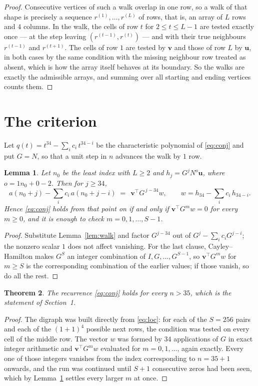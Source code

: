 \documentclass[11pt,a4paper]{article}
\theoremstyle{plain}
\newtheorem{theorem}{Theorem}
\newtheorem{lemma}[theorem]{Lemma}
\theoremstyle{definition}
\begin{document}
\begin{proof}
Consecutive vertices of such a walk overlap in one row, so a walk of that shape is
precisely a sequence $r^{(1)},\dots,r^{(L)}$ of rows, that is, an array of $L$ rows
and $4$ columns. In the walk, the cells of row $t$ for $2\le t\le L-1$ are tested
exactly once --- at the step leaving $(r^{(t-1)},r^{(t)})$ --- and with their true
neighbours $r^{(t-1)}$ and $r^{(t+1)}$. The cells of row $1$ are tested by
$\mathbf{v}$ and those of row $L$ by $\mathbf{u}$, in both cases by the same condition
with the missing neighbour row treated as absent, which is how the array itself behaves at
its boundary. So the walks are exactly the admissible arrays, and summing over all starting
and ending vertices counts them.
\end{proof}

\section{The criterion}

Let $q(t)=t^{34}-\sum_i c_i\,t^{34-i}$ be the characteristic polynomial of
\eqref{eq:conj} and put $G=N$, so that a unit step in $n$ advances the walk by
$1$ row.

\begin{lemma}\label{lem:crit}
Let $n_0$ be the least index with $L\ge2$ and $h_j=G^{j}N^{o}\mathbf{u}$, where
$o=1n_0+0-2$. Then for $j\ge34$,
\[
a(n_0+j)-\sum_i c_i\,a(n_0+j-i)\;=\;\,\mathbf{v}^{\!\top}G^{\,j-34}w,
\qquad w=h_{34}-\sum_i c_i\,h_{34-i} .
\]
Hence \eqref{eq:conj} holds from that point on if and only if
$\mathbf{v}^{\!\top}G^{m}w=0$ for every $m\ge0$, and it is enough to check
$m=0,1,\dots,S-1$.
\end{lemma}

\begin{proof}
Substitute Lemma~\ref{lem:walk} and factor $G^{j-34}$ out of
$G^{j}-\sum_ic_iG^{j-i}$; the nonzero scalar $1$ does not affect
vanishing. For the last clause, Cayley--Hamilton makes $G^{S}$ an integer combination of
$I,G,\dots,G^{S-1}$, so $\mathbf{v}^{\!\top}G^{m}w$ for $m\ge S$ is the corresponding
combination of the earlier values; if those vanish, so do all the rest.
\end{proof}

\begin{theorem}
The recurrence \eqref{eq:conj} holds for every $n>35$, which is the statement of
Section~1.
\end{theorem}

\begin{proof}
The digraph was built directly from \eqref{eq:loc}: for each of the $S=256$ pairs and each
of the $(1+1)^{4}$ possible next rows, the condition was tested on every cell of
the middle row. The vector $w$ was formed by $34$ applications of $G$ in exact integer
arithmetic and $\mathbf{v}^{\!\top}G^{m}w$ evaluated for $m=0,1,\dots$, again exactly.
Every one of those integers vanishes from the index corresponding to $n=35+1$ onwards,
and the run was continued until $S+1$ consecutive zeros had been seen, which by
Lemma~\ref{lem:crit} settles every larger $m$ at once.
\end{proof}
\end{document}
